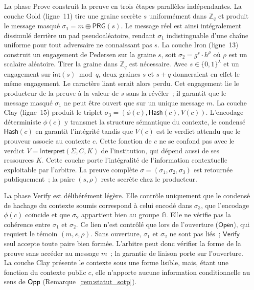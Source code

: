 \begin{sloppypar}
La phase \textsf{Prove} construit la preuve en trois \'etapes parall\`eles
ind\'ependantes. La couche Gold (ligne~11) tire une graine
secr\`ete $s$ uniform\'ement dans $\mathbb{Z}_q$ et produit le message
masqu\'e $\sigma_1 = m \oplus \mathsf{PRG}(s)$. Le message r\'eel est ainsi
int\'egralement dissimul\'e derri\`ere un pad pseudoal\'eatoire, rendant
$\sigma_1$ indistinguable d'une cha\^ine uniforme pour tout adversaire ne
connaissant pas $s$. La couche Iron (ligne~13) construit
un engagement de Pedersen sur la graine $s$, soit $\sigma_2 = g^{s} \cdot h^\rho$
o\`u $\rho$ est un scalaire al\'eatoire. Tirer la graine dans $\mathbb{Z}_q$ est
n\'ecessaire. Avec $s \in \{0,1\}^\lambda$ et un engagement sur $\mathsf{int}(s)
\bmod q$, deux graines $s$ et $s+q$ donneraient en effet le m\^eme engagement. Le caract\`ere liant
serait alors perdu. Cet
engagement lie le producteur de la preuve \`a la valeur de $s$ sans la
r\'ev\'eler~; il garantit que le message masqu\'e $\sigma_1$ ne peut \^etre
ouvert que sur un unique message $m$. La couche Clay
(ligne~15) produit le triplet $\sigma_3 = (\phi(c), \mathsf{Hash}(c), V(c))$.
L'encodage d\'eterministe $\phi(c)$ y transmet la structure s\'emantique du
contexte, le condens\'e $\mathsf{Hash}(c)$ en garantit l'int\'egrit\'e tandis que
$V(c)$ est le verdict attendu que le prouveur associe au contexte $c$. Cette fonction de $c$ ne se
confond pas avec le verdict $V = \mathsf{Interpret}(\Sigma, C, K)$ de l'institution, qui d\'epend
aussi de ses ressources $K$. Cette couche porte
l'int\'egralit\'e de l'information contextuelle exploitable par l'arbitre.
La preuve compl\`ete $\sigma = (\sigma_1, \sigma_2, \sigma_3)$ est
retourn\'ee publiquement~; la paire $(s, \rho)$ reste secr\`ete chez le
producteur.

La phase \textsf{Verify} est d\'elib\'er\'ement l\'eg\`ere. Elle contr\^ole
uniquement que le condens\'e de hachage du contexte soumis correspond \`a
celui encod\'e dans $\sigma_3$, que l'encodage $\phi(c)$ co\"incide et que
$\sigma_2$ appartient bien au groupe $\mathbb{G}$. Elle ne v\'erifie pas la
coh\'erence entre $\sigma_1$ et $\sigma_2$. Ce lien n'est contr\^ol\'e que lors
de l'ouverture ($\mathsf{Open}$), qui requiert le t\'emoin $(m, s, \rho)$.
Sans ouverture, $\sigma_1$ et $\sigma_2$ ne sont pas li\'es~;
$\mathsf{Verify}$ seul accepte toute paire bien form\'ee. L'arbitre peut
donc v\'erifier la forme de la preuve sans acc\'eder au message $m$~; la
garantie de liaison porte sur l'ouverture. La couche Clay pr\'esente le
contexte sous une forme lisible, mais, \'etant une fonction du contexte public
$c$, elle n'apporte aucune information conditionnelle au sens de $\mathsf{Opp}$
(Remarque~\ref{rem:statut_sotp}).


\end{sloppypar}
